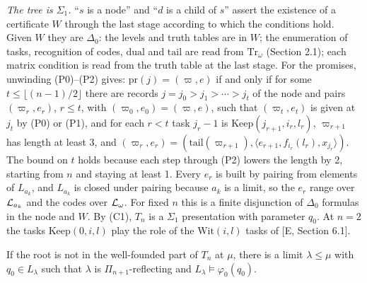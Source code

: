 \documentclass[11pt]{article}
\begin{document}
\emph{The tree is $\Sigma_1$.} ``$s$ is a node'' and ``$d$ is a child of $s$'' assert the existence of a certificate
$W$ through the last stage according to which the conditions hold. Given $W$ they are $\Delta_0$: the levels and truth
tables are in $W$; the enumeration of tasks, recognition of codes, $\mathrm{dual}$ and $\mathrm{tail}$ are read from
$\mathrm{Tr}_\omega$ (Section 2.1); each matrix condition is read from the truth table at the last stage. For the
promises, unwinding (P0)--(P2) gives: $\mathrm{pr}(j) = (\varpi, e)$ if and only if for some $t \le \lfloor (n-1)/2
\rfloor$ there are records $j = j_0 > j_1 > \cdots > j_t$ of the node and pairs $(\varpi_r, e_r)$, $r \le t$, with $(\varpi_0,
e_0) = (\varpi, e)$, such that $(\varpi_t, e_t)$ is given at $j_t$ by (P0) or (P1), and for each $r < t$ task $j_r - 1$ is
$\mathrm{Keep}(j_{r+1}, i_r, l_r)$, $\varpi_{r+1}$ has length at least 3, and $(\varpi_r, e_r) = (\mathrm{tail}(\varpi_{r+1}),
\langle e_{r+1}, f_{i_r}(l_r), x_{j_r}\rangle)$. The bound on $t$ holds because each step through (P2) lowers the
length by 2, starting from $n$ and staying at least 1. Every $e_r$ is built by pairing from elements of $L_{a_k}$, and
$L_{a_k}$ is closed under pairing because $a_k$ is a limit, so the $e_r$ range over $\mathcal{L}_{a_k}$ and the codes over
$\mathcal{L}_\omega$. For fixed $n$ this is a finite disjunction of $\Delta_0$ formulas in the node and $W$. By (C1), $T_n$ is a
$\Sigma_1$ presentation with parameter $q_0$. At $n = 2$ the tasks $\mathrm{Keep}(0,i,l)$ play the role of the
$\mathrm{Wit}(i,l)$ tasks of [E, Section 6.1].

\begin{statement} If the root is not in the well-founded part of $T_n$ at $\mu$, there is a
limit $\lambda \le \mu$ with $q_0 \in L_\lambda$ such that $\lambda$ is $\Pi_{n+1}$-reflecting and $L_\lambda \models
\varphi_0(q_0)$.
\end{statement}
\end{document}
